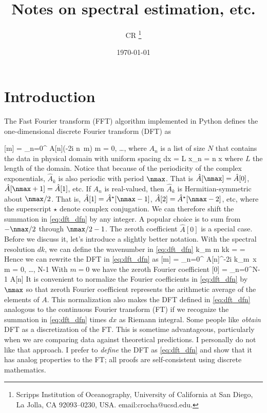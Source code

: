 \documentclass[11pt]{article}
\title{Notes on spectral estimation, etc.}
\author{
CR \thanks{Scripps Institution of Oceanography,
University of California at San Diego, La Jolla, CA
92093--0230, USA. email:crocha@ucsd.edu. }
}
\date{\today}
\begin{document}


\maketitle

\section{Introduction}

The Fast Fourier transform (FFT) algorithm implemented in Python defines the one-dimensional discrete Fourier transform (DFT) as

\beq
    \label{eq:dft_dfn}
    [m] =  \sum_{n=0}^{}
    A[n]\exp \left(-2\pi i {n \,m\over \nmax}\right)\com
   \qquad m = 0, \ldots, \com
\eeq
where $A_n$ is a list of size $N$ that contains the data in physical domain with uniform spacing
\beq
\label{eq:x_spacing}
dx = {L \over \nmax}\com\qqand x_n = n \dd x\com
\eeq
where $L$ the length of the domain. Notice that because of the periodicity of the complex exponentials, $\hat{A}_k$ is also periodic with period $\nmax$. That is $\hat{A}[\nmax] = \hat{A}[0]$, $\hat{A}[\nmax+1] = \hat{A}[1]$, etc. If $A_n$ is real-valued, then $\hat{A}_k$ is Hermitian-symmetric about $\nmax/2$. That is, $\hat{A}[1] = \hat{A}^\star[\nmax-1]$, $\hat{A}[2] = \hat{A}^\star[\nmax-2]$, etc, where the superscript $\star$ denote complex conjugation. We can therefore shift the summation in \eqref{eq:dft_dfn} by any integer. A popular choice is to sum from $-\nmax/2$ through $\nmax/2-1$. The zeroth coefficient $\hat{A}[0]$ is a special case. Before we discuss it, let's introduce a slightly better notation. With the spectral resolution $dk$, we can define the wavenumber in \eqref{eq:dft_dfn}
\beq
\label{eq:sepc_resol}
k_m  m \dd k\com\qqand \dd k = = \per
\eeq
Hence we can rewrite  the DFT in \eqref{eq:dft_dfn} as
\beq
\label{eq:dft_dfn_2}
    [m] =  \sum_{n=0}^{}
    A[n]\ee^{-2\pi i k_m\, x}\com
   \qquad m = 0, \ldots, N-1\per
\eeq
With $m=0$ we have the zeroth Fourier coefficient
\beq
\label{eq:zeroth_fc}
[0] = \sum_{n=0}^{N-1} A[n]\per
\eeq
It is convenient to normalize the Fourier coefficients in \eqref{eq:dft_dfn} by  $\nmax$  so that zeroth Fourier coefficient represents the arithmetic  average of the elements of $A$. This normalization also makes the DFT defined in \eqref{eq:dft_dfn}  analogous to the continuous Fourier transform (FT) if we recognize the summation in \eqref{eq:dft_dfn}  times $dx$ as Riemann integral. Some people like \textit{obtain} DFT as a discretization of the FT. This is sometime advantageous, particularly when we are comparing data against theoretical predictions. I personally do not like that approach. I prefer to \textit{define} the DFT as \eqref{eq:dft_dfn} and show that it has analog properties to the FT; all proofs are self-consistent using discrete mathematics.
\end{document}
